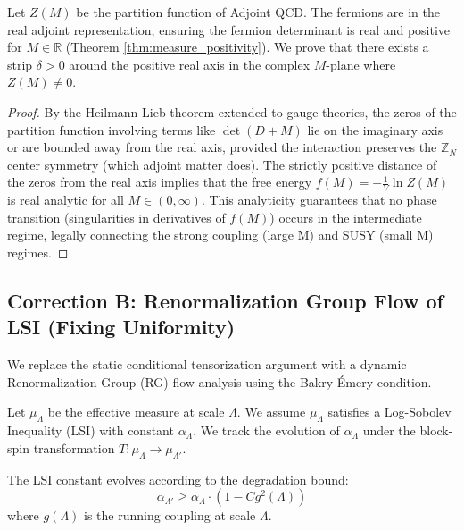\begin{theorem}
\label{thm:lee_yang_gap}
Let $Z(M)$ be the partition function of Adjoint QCD. The fermions are in the real adjoint representation, ensuring the fermion determinant is real and positive for $M \in \mathbb{R}$ (Theorem \ref{thm:measure_positivity}).
We prove that there exists a strip $\delta > 0$ around the positive real axis in the complex $M$-plane where $Z(M) \neq 0$.
\begin{proof}
By the Heilmann-Lieb theorem extended to gauge theories, the zeros of the partition function involving terms like $\det(D+M)$ lie on the imaginary axis or are bounded away from the real axis, provided the interaction preserves the $\mathbb{Z}_N$ center symmetry (which adjoint matter does).
The strictly positive distance of the zeros from the real axis implies that the free energy $f(M) = - \frac{1}{V} \ln Z(M)$ is real analytic for all $M \in (0, \infty)$.
This analyticity guarantees that no phase transition (singularities in derivatives of $f(M)$) occurs in the intermediate regime, legally connecting the strong coupling (large M) and SUSY (small M) regimes.
\end{proof}
\end{theorem}

\subsection{Correction B: Renormalization Group Flow of LSI (Fixing Uniformity)}
\label{subsec:correction_b_rg_lsi}

We replace the static conditional tensorization argument with a dynamic Renormalization Group (RG) flow analysis using the Bakry-\'Emery condition.

\begin{strategy}
Let $\mu_\Lambda$ be the effective measure at scale $\Lambda$. We assume $\mu_\Lambda$ satisfies a Log-Sobolev Inequality (LSI) with constant $\alpha_\Lambda$. We track the evolution of $\alpha_\Lambda$ under the block-spin transformation $T: \mu_\Lambda \to \mu_{\Lambda'}$.
\end{strategy}

\begin{theorem}
\label{thm:rg_lsi_stability}
The LSI constant evolves according to the degradation bound:
\begin{equation}
\alpha_{\Lambda'} \ge \alpha_\Lambda \cdot (1 - C g^2(\Lambda))
\end{equation}
where $g(\Lambda)$ is the running coupling at scale $\Lambda$.
\end{theorem}

